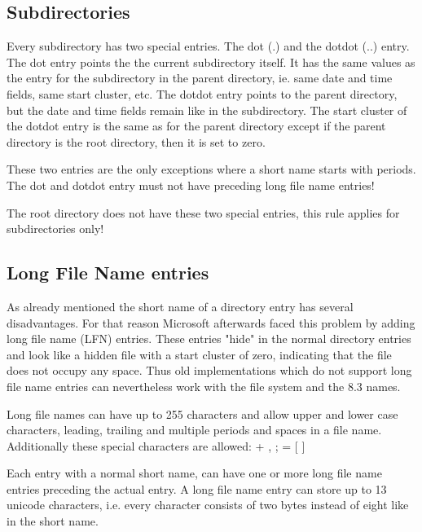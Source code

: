 \subsection{Subdirectories}

Every subdirectory has two special entries. The dot (.) and the dotdot (..) entry. The dot entry points the the current subdirectory itself. It has the same values as the entry for the subdirectory in the parent directory, ie. same date and time fields, same start cluster, etc. The dotdot entry points to the parent directory, but the date and time fields remain like in the subdirectory. The start cluster of the dotdot entry is the same as for the parent directory except if the parent directory is the root directory, then it is set to zero.

These two entries are the only exceptions where a short name starts with periods. The dot and dotdot entry must not have preceding long file name entries!

The root directory does not have these two special entries, this rule applies for subdirectories only!

\subsection{Long File Name entries}

As already mentioned the short name of a directory entry has several disadvantages. For that reason Microsoft afterwards faced this problem by adding long file name (LFN) entries. These entries "hide" in the normal directory entries and look like a hidden file with a start cluster of zero, indicating that the file does not occupy any space. Thus old implementations which do not support long file name entries can nevertheless work with the file system and the 8.3 names.

Long file names can have up to 255 characters and allow upper and lower case characters, leading, trailing and multiple periods and spaces in a file name\cite{usb_ms_jan}. Additionally these special characters are allowed\cite{fatgen103}: + , ; = [ ] 

Each entry with a normal short name, can have one or more long file name entries preceding the actual entry. A long file name entry can store up to 13 unicode characters, i.e. every character consists of two bytes instead of eight like in the short name.

